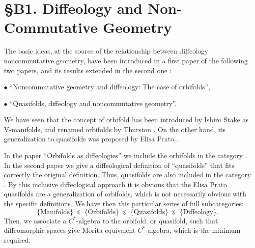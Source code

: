 
\chapter*{\S B1. Diffeology and Non-Commutative Geometry}
\setcounter{footnote}{0}

\begin{abstract}
  In this lecture we show how we can build a bridge between some diffeological spaces and noncommutative geometry,
  such that diffeomorphic spaces give Morita equivalent $C^*$-algebras.
  These spaces are orbifolds,
  generalized by quasifolds,
  regarded as diffeological spaces.
\end{abstract}


The basic ideas,
at the source of the relationship between diffeology noncommutative geometry,
have been introduced in a first paper \cite{IZL18} of the following two papers,
and its results extended in the second one \cite{IZP21}:

$\bullet$ ``Noncommutative geometry and diffeology: The case of orbifolds'',

$\bullet$ ``Quasifolds, diffeology and noncommutative geometry''.

We have seen that the concept of orbifold has been introduced by Ishiro Stake \cite{Sat56,Sat57} as V-manifolds,
and renamed orbifolds by Thurston \cite{Thu78}.
On the other hand,
its generalization to quasifolds was proposed by Elisa Prato \cite{EP01}.

In the paper ``Orbifolds as diffeologies'' \cite{IKZ10} we include the orbifolds in the category .
In the second paper we give a diffeological definition of ``quasifolds'' that fits correctly the original definition.
Thus,
quasifolds are also included in the category .
By this inclusive diffeological approach it is obvious that the Elisa Prato quasifolds are a generalization of orbifolds,
which is not necessarily obvious with the specific definitions.
We have then this particular series of full subcategories:
\[
  \text{\{Manifolds\} $\preceq$ \{Orbifolds\} $\preceq$ \{Quasifolds\} $\preceq$ \{Diffeology\}}.
  \]
Then,
we associate a $C^*$-algebra to the orbifold,
or quasifold,
such that diffeomorphic spaces give Morita equivalent $C^*$-algebra,
which is the minimum required.

